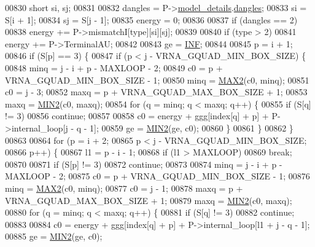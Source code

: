 \begin{DoxyCode}
00830   \textcolor{keywordtype}{short} si, sj;
00831 
00832   dangles = P->\hyperlink{group__energy__parameters_a7b84353eb9075c595bad4ceb871bcae7}{model\_details}.\hyperlink{group__model__details_adcda4ff2ea77748ae0e8700288282efc}{dangles};
00833   si      = S[i + 1];
00834   sj      = S[j - 1];
00835   energy  = 0;
00836 
00837   \textcolor{keywordflow}{if} (dangles == 2)
00838     energy += P->mismatchI[type][si][sj];
00839 
00840   \textcolor{keywordflow}{if} (type > 2)
00841     energy += P->TerminalAU;
00842 
00843   ge = \hyperlink{energy__const_8h_a12c2040f25d8e3a7b9e1c2024c618cb6}{INF};
00844 
00845   p = i + 1;
00846   \textcolor{keywordflow}{if} (S[p] == 3) \{
00847     \textcolor{keywordflow}{if} (p < j - VRNA\_GQUAD\_MIN\_BOX\_SIZE) \{
00848       minq  = j - i + p - MAXLOOP - 2;
00849       c0    = p + VRNA\_GQUAD\_MIN\_BOX\_SIZE - 1;
00850       minq  = \hyperlink{group__utils_ga33297b3679c713b0c4d897cd0fe3b122}{MAX2}(c0, minq);
00851       c0    = j - 3;
00852       maxq  = p + VRNA\_GQUAD\_MAX\_BOX\_SIZE + 1;
00853       maxq  = \hyperlink{group__utils_gae0b9cd0ce090bd69b951aa73e8fa4f7d}{MIN2}(c0, maxq);
00854       \textcolor{keywordflow}{for} (q = minq; q < maxq; q++) \{
00855         \textcolor{keywordflow}{if} (S[q] != 3)
00856           \textcolor{keywordflow}{continue};
00857 
00858         c0  = energy + ggg[index[q] + p] + P->internal\_loop[j - q - 1];
00859         ge  = \hyperlink{group__utils_gae0b9cd0ce090bd69b951aa73e8fa4f7d}{MIN2}(ge, c0);
00860       \}
00861     \}
00862   \}
00863 
00864   \textcolor{keywordflow}{for} (p = i + 2;
00865        p < j - VRNA\_GQUAD\_MIN\_BOX\_SIZE;
00866        p++) \{
00867     l1 = p - i - 1;
00868     \textcolor{keywordflow}{if} (l1 > MAXLOOP)
00869       \textcolor{keywordflow}{break};
00870 
00871     \textcolor{keywordflow}{if} (S[p] != 3)
00872       \textcolor{keywordflow}{continue};
00873 
00874     minq  = j - i + p - MAXLOOP - 2;
00875     c0    = p + VRNA\_GQUAD\_MIN\_BOX\_SIZE - 1;
00876     minq  = \hyperlink{group__utils_ga33297b3679c713b0c4d897cd0fe3b122}{MAX2}(c0, minq);
00877     c0    = j - 1;
00878     maxq  = p + VRNA\_GQUAD\_MAX\_BOX\_SIZE + 1;
00879     maxq  = \hyperlink{group__utils_gae0b9cd0ce090bd69b951aa73e8fa4f7d}{MIN2}(c0, maxq);
00880     \textcolor{keywordflow}{for} (q = minq; q < maxq; q++) \{
00881       \textcolor{keywordflow}{if} (S[q] != 3)
00882         \textcolor{keywordflow}{continue};
00883 
00884       c0  = energy + ggg[index[q] + p] + P->internal\_loop[l1 + j - q - 1];
00885       ge  = \hyperlink{group__utils_gae0b9cd0ce090bd69b951aa73e8fa4f7d}{MIN2}(ge, c0);

\end{DoxyCode}

